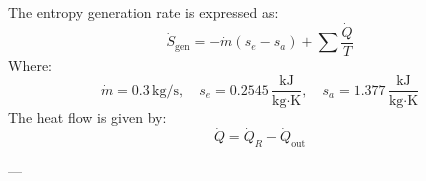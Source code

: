 The entropy generation rate is expressed as:  
\[
\dot{S}_{\text{gen}} = -\dot{m}(s_e - s_a) + \sum \frac{\dot{Q}}{T}
\]  
Where:  
\[
\dot{m} = 0.3 \, \text{kg/s}, \quad s_e = 0.2545 \, \frac{\text{kJ}}{\text{kg·K}}, \quad s_a = 1.377 \, \frac{\text{kJ}}{\text{kg·K}}
\]  
The heat flow is given by:  
\[
\dot{Q} = \dot{Q}_R - \dot{Q}_{\text{out}}
\]  

---
